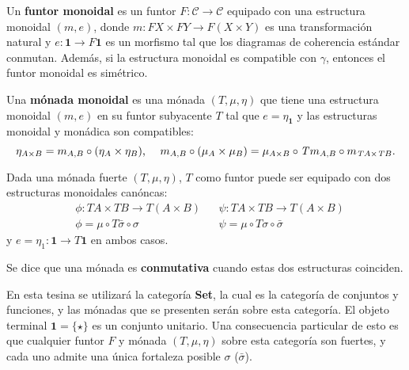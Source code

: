\begin{definition}
Un \textbf{funtor monoidal} es un funtor $\mathit{F}: \mathscr{C} \rightarrow \mathscr{C}$ equipado con una estructura monoidal $(m,e)$, donde $m : \mathit{F} X \times \mathit{F} Y \rightarrow \mathit{F} (X \times Y)$ es una transformación natural y $e : \mathbf
{1} \rightarrow \mathit{F} \mathbf{1}$ es un morfismo tal que los diagramas de coherencia estándar conmutan. Además, si la estructura monoidal es compatible con $\gamma$, entonces el funtor monoidal es simétrico.
\end{definition}

\begin{definition}
Una \textbf{mónada monoidal} es una mónada $(\textit{T},\mu,\eta)$ que tiene una estructura monoidal $(m,e)$ en su funtor subyacente $\mathit{T}$ tal que $e = \eta_{\mathbf{1}}$ y las estructuras monoidal y monádica son compatibles:
\begin{equation*}
\eta_{A \times B} = m_{A,B} \circ (\eta_A \times \eta_B) \text{, \quad} m_{A,B} \circ (\mu_A \times \mu_B) = \mu_{A \times B} \circ \mathit{T}m_{A,B} \circ m_{\mathit{T}A \times \mathit{T}B}.
\end{equation*}
\end{definition}

Dada una mónada fuerte $(\mathit{T},\mu,\eta)$, $\mathit{T}$ como funtor puede ser equipado con dos estructuras monoidales canóncas:
\begin{align*}
&\phi : \mathit{T}A \times \mathit{T}B \rightarrow \mathit{T} (A \times B) & &\psi : \mathit{T}A \times \mathit{T}B \rightarrow \mathit{T}(A \times B) \\
&\phi = \mu \circ \mathit{T}\bar{\sigma} \circ \sigma & &\psi = \mu \circ \mathit{T}\sigma \circ \bar{\sigma}
\end{align*}
y $e = \eta_1 : \mathbf{1} \rightarrow \mathit{T}\mathbf{1}$ en ambos casos. 

Se dice que una mónada es \textbf{conmutativa} cuando estas dos estructuras coinciden.

En esta tesina se utilizará la categoría \textbf{Set}, la cual es la categoría de conjuntos y funciones, y las mónadas que se presenten serán sobre esta categoría. El objeto terminal $\mathbf{1} = \{\star\}$ es un conjunto unitario. Una consecuencia particular de esto es que cualquier funtor $\mathit{F}$ y mónada $(\mathit{T},\mu,\eta)$ sobre esta categoría son fuertes, y cada uno admite una única fortaleza posible $\sigma$ ($\bar{\sigma}$). 

